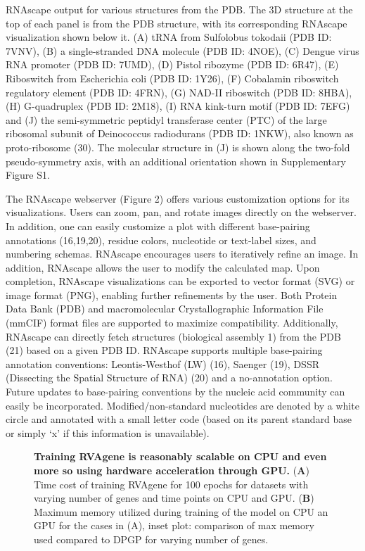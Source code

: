RNAscape output for various structures from the PDB. The 3D structure at the top of each panel is from the PDB structure, with its corresponding RNAscape visualization shown below it. (A) tRNA from Sulfolobus tokodaii (PDB ID: 7VNV), (B) a single-stranded DNA molecule (PDB ID: 4NOE), (C) Dengue virus RNA promoter (PDB ID: 7UMD), (D) Pistol ribozyme (PDB ID: 6R47), (E) Riboswitch from Escherichia coli (PDB ID: 1Y26), (F) Cobalamin riboswitch regulatory element (PDB ID: 4FRN), (G) NAD-II riboswitch (PDB ID: 8HBA), (H) G-quadruplex (PDB ID: 2M18), (I) RNA kink-turn motif (PDB ID: 7EFG) and (J) the semi-symmetric peptidyl transferase center (PTC) of the large ribosomal subunit of Deinococcus radiodurans (PDB ID: 1NKW), also known as proto-ribosome (30). The molecular structure in (J) is shown along the two-fold pseudo-symmetry axis, with an additional orientation shown in Supplementary Figure S1.
\par
The RNAscape webserver (Figure 2) offers various customization options for its visualizations. Users can zoom, pan, and rotate images directly on the webserver. In addition, one can easily customize a plot with different base-pairing annotations (16,19,20), residue colors, nucleotide or text-label sizes, and numbering schemas. RNAscape encourages users to iteratively refine an image. In addition, RNAscape allows the user to modify the calculated map. Upon completion, RNAscape visualizations can be exported to vector format (SVG) or image format (PNG), enabling further refinements by the user. Both Protein Data Bank (PDB) and macromolecular Crystallographic Information File (mmCIF) format files are supported to maximize compatibility. Additionally, RNAscape can directly fetch structures (biological assembly 1) from the PDB (21) based on a given PDB ID. RNAscape supports multiple base-pairing annotation conventions: Leontis-Westhof (LW) (16), Saenger (19), DSSR (Dissecting the Spatial Structure of RNA) (20) and a no-annotation option. Future updates to base-pairing conventions by the nucleic acid community can easily be incorporated. Modified/non-standard nucleotides are denoted by a white circle and annotated with a small letter code (based on its parent standard base or simply ‘x’ if this information is unavailable).
\begin{center}
    \begin{figure}
        \caption[Computational cost of training RVAgene]{\textbf{Training RVAgene is reasonably scalable on CPU and even more so using hardware acceleration through GPU.} ({\bf A}) Time cost of training RVAgene for 100 epochs for datasets with varying number of genes and time points on CPU and GPU. ({\bf B}) Maximum memory utilized during training of the model on CPU an GPU for the cases in (A), inset plot: comparison of max memory used compared to DPGP for varying number of genes.}
  \label{fig:rnascape1}
\end{figure}
\end{center}
